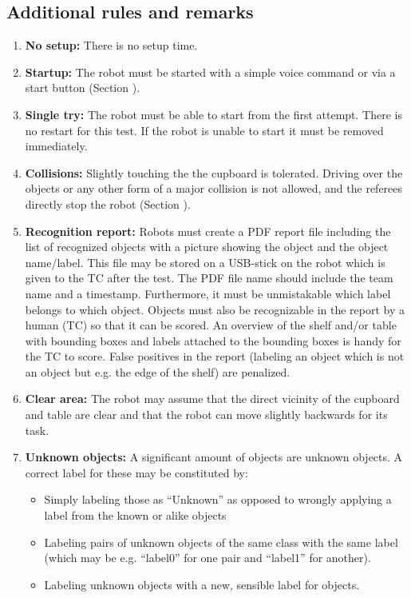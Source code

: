 \subsection{Additional rules and remarks}
\begin{enumerate}
\item \textbf{No setup:} There is no setup time.
\item \textbf{Startup:} The robot must be started with a simple voice command or via a start button (Section ). 
\item \textbf{Single try:} The robot must be able to start from the first attempt. There is no restart for this test. If the robot is unable to start it must be removed immediately.
\item \textbf{Collisions:} Slightly touching the the cupboard is tolerated.
  Driving over the objects or any other form of a major collision is not allowed, and the referees directly stop the robot (Section ).
\item \textbf{Recognition report:} Robots must create a PDF report file including the list of recognized objects with a picture showing the object and the object name/label.
  This file may be stored on a USB-stick on the robot which is given to the TC after the test. The PDF file name should include the team name and a timestamp. 
  Furthermore, it must be unmistakable which label belongs to which object. Objects must also be recognizable in the report by a human (TC) so that it can be scored. 
  An overview of the shelf and/or table with bounding boxes and labels attached to the bounding boxes is handy for the TC to score.
  False positives in the report (labeling an object which is not an object but e.g. the edge of the shelf) are penalized.
  \item \textbf{Clear area: } The robot may assume that the direct vicinity of the cupboard and table are clear and that the robot can move slightly backwards for its task.
  \item \textbf{Unknown objects:} A significant amount of objects are unknown objects. A correct label for these may be constituted by: 
  \begin{itemize}
   \item Simply labeling those as ``Unknown'' as opposed to wrongly applying a label from the known or alike objects
   \item Labeling pairs of unknown objects of the same class with the same label (which may be e.g. ``label0'' for one pair and ``label1'' for another). 
   \item Labeling unknown objects with a new, sensible label for objects.
  \end{itemize}
\end{enumerate}

